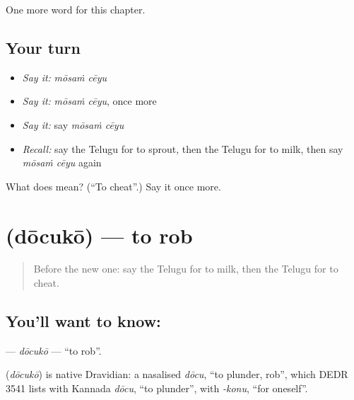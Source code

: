 \begin{grammarlens}[title={What you've built}]
One more word for this chapter.
\end{grammarlens}

\subsection*{Your turn}
\begin{itemize}
\raggedright
  \item \emph{Say it:} \emph{mōsaṁ cēyu}
  \item \emph{Say it:} \emph{mōsaṁ cēyu}, once more
  \item \emph{Say it:} say \emph{mōsaṁ cēyu}
  \item \emph{Recall:} say the Telugu for to sprout, then the Telugu for to milk, then say \emph{mōsaṁ cēyu} again
\end{itemize}

\begin{tcolorbox}[breakable,colback=teal!4,colframe=teal!35!black,title={Before you move on}]
What does   mean? (\textquotedblleft{}To cheat\textquotedblright{}.) Say it once more.
\end{tcolorbox}
\section[\texorpdfstring{\te{దోచుకో} (dōcukō)}{దోచుకో (dōcukō)}]{ (dōcukō) — to rob}

\label{lesson:TE-C248-docuko}



\begin{quote}
Before the new one: say the Telugu for to milk, then the Telugu for to cheat.
\end{quote}

\subsection*{You'll want to know: }
\textbf{} — \emph{dōcukō} — \textquotedblleft{}to rob\textquotedblright{}.

\begin{cousinweb}
\textbf{} (\emph{dōcukō}) is native Dravidian: a nasalised \emph{dōcu}, \textquotedblleft{}to plunder, rob\textquotedblright{}, which DEDR 3541 lists with Kannada \emph{dōcu}, \textquotedblleft{}to plunder\textquotedblright{}, with \emph{-konu}, \textquotedblleft{}for oneself\textquotedblright{}.
\end{cousinweb}

